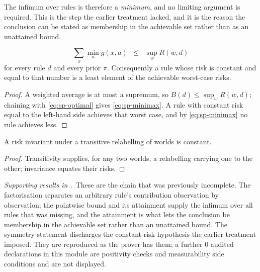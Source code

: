 
The infimum over rules is therefore a \emph{minimum}, and no limiting argument is required.
This is the step the earlier treatment lacked, and it is the reason the conclusion can be
stated as membership in the achievable set rather than as an unattained bound.

\begin{theorem}
\label{thm:sp-minimax}
\begin{equation}
\sum_{x}\min_{a}g(x,a)\;\;\leq\;\;\sup_{w}R(w,d)
\label{eq:sp-minimax}
\end{equation}
for every rule $d$ and every prior $\pi$. Consequently a rule whose risk is constant and equal
to that number is a least element of the achievable worst-case risks.
\end{theorem}

\begin{proof}
A weighted average is at most a supremum, so $B(d)\le\sup_{w}R(w,d)$; chaining with
\eqref{eq:sp-optimal} gives \eqref{eq:sp-minimax}. A rule with constant risk equal to the left-hand
side achieves that worst case, and by \eqref{eq:sp-minimax} no rule achieves less.
\end{proof}


\begin{proposition}
\label{prop:sp-symmetry}
A risk invariant under a transitive relabelling of worlds is constant.
\end{proposition}

\begin{proof}
Transitivity supplies, for any two worlds, a relabelling carrying one to the other;
invariance equates their risks.
\end{proof}


\noindent\emph{Supporting results in .}~These are the chain that was previously incomplete. The factorisation separates an arbitrary rule's contribution observation by observation; the pointwise bound and its attainment supply the infimum over all rules that was missing, and the attainment is what lets the conclusion be membership in the achievable set rather than an unattained bound. The symmetry statement discharges the constant-risk hypothesis the earlier treatment imposed. They are reproduced as the prover has them; a further $0$ audited declarations in this module are positivity checks and measurability side conditions and are not displayed.

